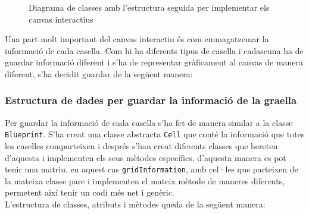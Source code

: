 \begin{figure}[H]
{
    }
    \caption{Diagrama de classes amb l'estructura seguida per implementar els canvas interactius}
    \label{fig:blueprint_class_diagram}
\end{figure}


Una part molt important del canvas interactiu és com emmagatzemar la informació de cada casella. Com hi ha diferents tipus de casella i cadascuna ha de guardar informació diferent i s'ha de representar gràficament al canvas de manera diferent, s'ha decidit guardar de la següent manera:

\subsubsection{Estructura de dades per guardar la informació de la graella}
Per guardar la informació de cada casella s'ha fet de manera similar a la classe \texttt{Blueprint}. S'ha creat una classe abstracta \texttt{Cell} que conté la informació que totes les caselles comparteixen i després s'han creat diferents classes que hereten d'aquesta i implementen els seus mètodes específics, d'aquesta manera es pot tenir una matriu, en aquest cas \texttt{gridInformation}, amb cel·les que parteixen de la mateixa classe pare i implementen el mateix mètode de maneres diferents, permetent així tenir un codi més net i genèric.\\
L'estructura de classes, atributs i mètodes queda de la següent manera:


